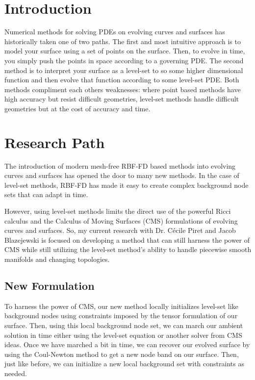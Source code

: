 \documentclass[a4paper,11pt]{article}
\begin{document}
\section*{Introduction}
	Numerical methods for solving PDEs on evolving curves and surfaces has historically taken one of two paths. The first and most intuitive approach is to model your surface using a set of points on the surface. Then, to evolve in time, you simply push the points in space according to a governing PDE. The second method is to interpret your surface as a level-set to so some higher dimensional function and then evolve that function according to some level-set PDE. Both methods compliment each others weaknesses: where point based methods have high accuracy but resist difficult geometries, level-set methods handle difficult geometries but at the cost of accuracy and time. 
	
\section*{Research Path}
	The introduction of modern mesh-free RBF-FD based methods into evolving curves and surfaces has opened the door to many new methods. In the case of level-set methods, RBF-FD has made it easy to create complex background node sets that can adapt in time.
	
	However, using level-set methods limits the direct use of the powerful Ricci calculus and the Calculus of Moving Surfaces (CMS) formulations of evolving curves and surfaces. So, my current research with Dr. C\'ecile Piret and Jacob Blazejewski is focused on developing a method that can still harness the power of CMS while still utilizing the level-set method's ability to handle piecewise smooth manifolds and changing topologies. 
	
\subsection*{New Formulation}
	To harness the power of CMS, our new method locally initializes level-set like background nodes using constraints imposed by the tensor formulation of our surface. Then, using this local background node set, we can march our ambient solution in time either using the level-set equation or another solver from CMS ideas. Once we have marched a bit in time, we can recover our evolved surface by using the Coul-Newton method to get a new node band on our surface. Then, just like before, we can initialize a new local background set with constraints as needed.
	
\end{document}
